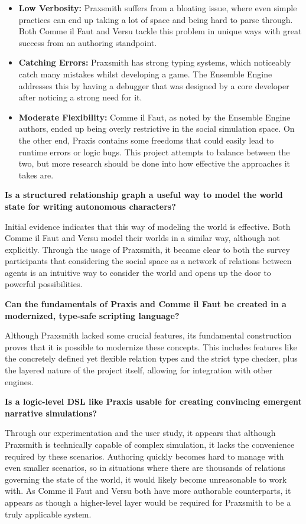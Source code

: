 \begin{itemize}
    \item \textbf{Low Verbosity:} Praxsmith suffers from a bloating issue, where
    even simple practices can end up taking a lot of space and being hard to parse
    through. Both Comme il Faut and Versu tackle this problem
    in unique ways with great success from an authoring standpoint.
    \item \textbf{Catching Errors:} Praxsmith has strong typing systems, which
    noticeably catch many mistakes whilst developing a game. The Ensemble Engine
    addresses this by having a debugger that was designed by a core developer
    after noticing a strong need for it.
    \item \textbf{Moderate Flexibility:} Comme il Faut, as noted by the Ensemble
    Engine authors, ended up being overly restrictive in the social simulation
    space. On the other end, Praxis contains some freedoms that could easily lead
    to runtime errors or logic bugs. This project attempts to balance between the
    two, but more research should be done into how effective the approaches it
    takes are.
\end{itemize}

\textbf{Is a structured relationship graph a useful way to model the world state for
writing autonomous characters?}

Initial evidence indicates that this way of modeling the world is effective.
Both Comme il Faut and Versu model their worlds in a similar way, although
not explicitly. Through the usage of Praxsmith, it became clear to both the survey
participants that considering the social space as a network of
relations between agents is an intuitive way to consider the world and opens up
the door to powerful possibilities.

\textbf{Can the fundamentals of Praxis and Comme il Faut be created
in a modernized, type-safe scripting language?}

Although Praxsmith lacked some crucial features, its fundamental construction proves
that it is possible to modernize these concepts. This includes features like the concretely defined
yet flexible relation types and the strict type checker, plus the layered nature of the
project itself, allowing for integration with other engines.

\textbf{Is a logic-level DSL like Praxis usable for creating convincing
emergent narrative simulations?}

Through our experimentation and the user study, it appears that although Praxsmith is
technically capable of complex simulation, it lacks the convenience required by these
scenarios. Authoring quickly becomes hard to manage with even smaller scenarios, so
in situations where there are thousands of relations governing the state of the world,
it would likely become unreasonable to work with. As Comme il Faut and Versu both have
more authorable counterparts, it appears as though a higher-level layer would be required
for Praxsmith to be a truly applicable system.

